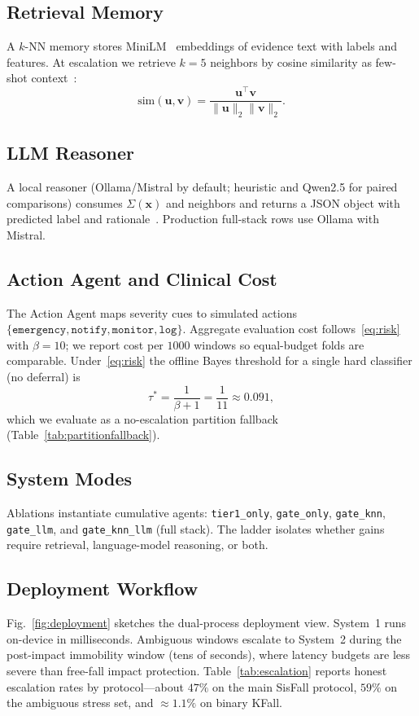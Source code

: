 \documentclass[journal]{IEEEtran}
\begin{document}
\subsection{Retrieval Memory}
A $k$-NN memory stores MiniLM~\cite{minilm2020} embeddings of evidence text with labels and features. At escalation we retrieve $k{=}5$ neighbors by cosine similarity as few-shot context~\cite{lewis2020rag}:
\begin{equation}
\mathrm{sim}(\mathbf{u},\mathbf{v})=\frac{\mathbf{u}^\top\mathbf{v}}{\|\mathbf{u}\|_2\|\mathbf{v}\|_2}.
\label{eq:cosine}
\end{equation}

\subsection{LLM Reasoner}
A local reasoner (Ollama/Mistral by default; heuristic and Qwen2.5 for paired comparisons) consumes $\Sigma(\mathbf{x})$ and neighbors and returns a JSON object with predicted label and rationale~\cite{wei2022cot,mistral2023,qwen2024,ollama}. Production full-stack rows use Ollama with Mistral.

\subsection{Action Agent and Clinical Cost}
The Action Agent maps severity cues to simulated actions $\{\texttt{emergency},\texttt{notify},\texttt{monitor},\texttt{log}\}$. Aggregate evaluation cost follows~\eqref{eq:risk} with $\beta{=}10$; we report cost per $1000$ windows so equal-budget folds are comparable. Under~\eqref{eq:risk} the offline Bayes threshold for a single hard classifier (no deferral) is
\begin{equation}
\tau^{*}=\frac{1}{\beta+1}=\frac{1}{11}\approx 0.091,
\label{eq:tau_star}
\end{equation}
which we evaluate as a no-escalation partition fallback (Table~\ref{tab:partitionfallback}).

\subsection{System Modes}
Ablations instantiate cumulative agents:
\texttt{tier1\_only}, \texttt{gate\_only}, \texttt{gate\_knn}, \texttt{gate\_llm}, and \texttt{gate\_knn\_llm} (full stack). The ladder isolates whether gains require retrieval, language-model reasoning, or both.

\subsection{Deployment Workflow}
\label{sec:deployment}
Fig.~\ref{fig:deployment} sketches the dual-process deployment view. System~1 runs on-device in milliseconds. Ambiguous windows escalate to System~2 during the post-impact immobility window (tens of seconds), where latency budgets are less severe than free-fall impact protection. Table~\ref{tab:escalation} reports honest escalation rates by protocol---about $47\%$ on the main SisFall protocol, $59\%$ on the ambiguous stress set, and $\approx 1.1\%$ on binary KFall.
\end{document}
